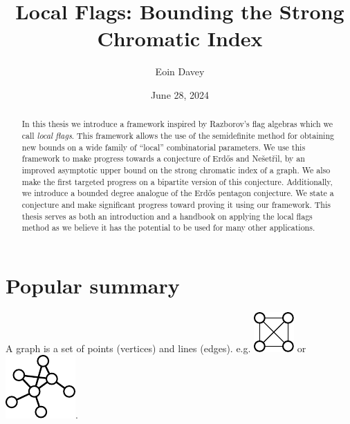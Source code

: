 \documentclass{uvamath}
\title{Local Flags: Bounding the Strong Chromatic Index} %
\author[eoin.davey@student.uva.nl, 14246287]{Eoin Davey} %
\date{June 28, 2024} %
\begin{document}
\maketitle
\restoregeometry

\begin{abstract}
    In this thesis we introduce a framework inspired by Razborov's flag algebras
    which we call \textit{local flags}. This framework allows the use of
    the semidefinite method for obtaining new bounds on a wide family of ``local'' combinatorial
    parameters. We use this framework to
    make progress towards a conjecture of Erd\H{o}s and Nešetřil, by an improved
    asymptotic upper bound on the strong chromatic index of a graph.
    We also make the first targeted progress on a bipartite version of
    this conjecture.
    Additionally, we introduce a bounded degree analogue of the Erd\H{o}s pentagon
    conjecture. We state a conjecture and make significant progress toward proving it using
    our framework. This thesis serves as both an introduction and a handbook on applying
    the local flags method as we believe it has the potential to be used for many other applications.
\end{abstract}

\setcounter{tocdepth}{1}
\tableofcontents
\restoregeometry














\chapter*{Popular summary}
A graph is a set of points (vertices) and lines (edges).
e.g. \includegraphics[align=c,scale=1]{flags/k4} or
\includegraphics[align=c,scale=0.75]{pop_sum_graph}.
\end{document}
